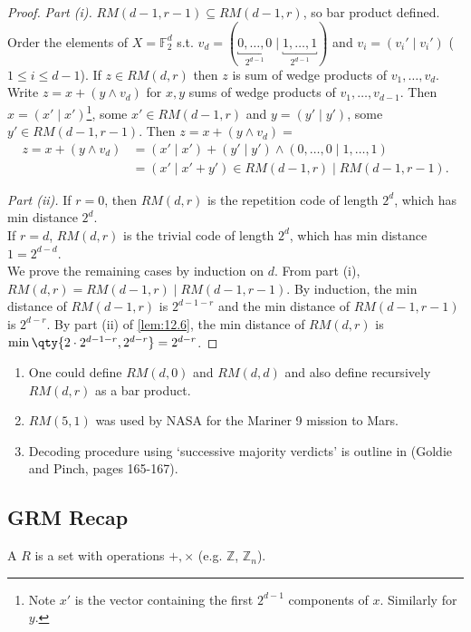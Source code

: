 \begin{proof}
    \emph{Part (i).}
    $RM(d-1, r-1) \subseteq RM(d-1, r)$, so bar product defined.
    Order the elements of $X = \mathbb{F}_2^d$ s.t. $v_d = (\underbracket{0, \dots, 0}_{2^{d-1}} \mid \underbracket{1, \dots, 1}_{2^{d-1}})$ and $v_i = (v_i' \mid v_i')$ ($1 \leq i \leq d - 1$).
    If $z \in RM(d, r)$ then $z$ is sum of wedge products of $v_1, \dots, v_d$.
    Write $z = x + (y \wedge v_d)$ for $x, y$ sums of wedge products of $v_1, \dots, v_{d-1}$.
    Then $x = (x' \mid x')$\footnote{Note $x'$ is the vector containing the first $2^{d-1}$ components of $x$. Similarly for $y$.}, some $x' \in RM(d-1, r)$ and $y = (y' \mid y')$, some $y' \in RM(d-1, r-1)$.
    Then $z = x + (y \wedge v_d) = $
    \begin{align*}
        z = x + (y \wedge v_d) &= (x' \mid x') + (y' \mid y') \wedge (0, \dots, 0 \mid 1, \dots, 1) \\
        &= (x' \mid x' + y') \in RM(d-1, r) \mid RM(d-1, r-1).
    \end{align*}

    \emph{Part (ii).}
    If $r = 0$, then $RM(d,r)$ is the repetition code of length $2^d$, which has min distance $2^d$. \\
    If $r = d$, $RM(d,r)$ is the trivial code of length $2^d$, which has min distance $1 = 2^{d-d}$. \\
    We prove the remaining cases by induction on $d$.
    From part (i), $RM(d,r) = RM(d-1,r) \mid RM(d-1,r-1)$.
    By induction, the min distance of $RM(d-1,r)$ is $2^{d-1-r}$ and the min distance of $RM(d-1,r-1)$ is $2^{d-r}$.
    By part (ii) of \cref{lem:12.6}, the min distance of $RM(d,r)$ is $\min\qty{2\cdot 2^{d-1-r}, 2^{d-r}} = 2^{d-r}$.
\end{proof}

\begin{remark}
    \begin{enumerate}
        \item One could define $RM(d, 0)$ and $RM(d, d)$ and also define recursively $RM(d, r)$ as a bar product.
        \item $RM(5, 1)$ was used by NASA for the Mariner 9 mission to Mars.
        \item Decoding procedure using `successive majority verdicts' is outline in (Goldie and Pinch, pages 165-167).
    \end{enumerate}
\end{remark}

\subsection{GRM Recap}
\begin{definition}[Ring]
    A  $R$ is a set with operations $+, \times$ (e.g. $\mathbb{Z}$, $\mathbb{Z}_n$).
\end{definition}

